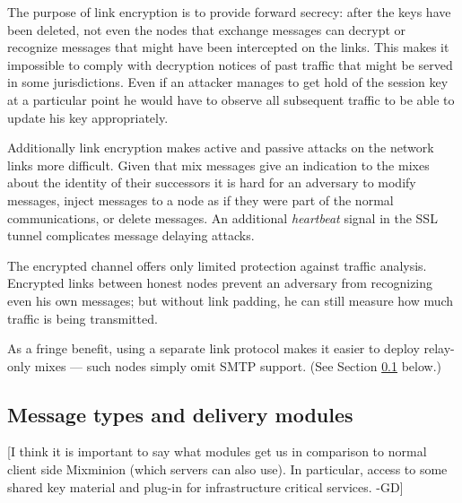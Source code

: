 \documentclass[11pt]{IEEEtran}
\begin{document}
The purpose of link encryption is to provide forward secrecy: 
after the keys have been deleted, not even the
nodes that exchange messages can decrypt or recognize messages
that might have been intercepted on the links. This makes it
impossible to comply with decryption notices of past traffic 
that might be served in
some jurisdictions.  
Even if an
attacker manages to get hold of the session key at a particular point
he would have to observe all subsequent traffic to be able to update
his key appropriately.

Additionally link encryption makes active and passive attacks on the
network links more difficult. Given that mix messages give an
indication to the mixes about the identity of their successors it is
hard for an 
adversary to modify messages, inject messages to a node as if they
were part of the normal communications, or delete messages.
An additional \emph{heartbeat} signal in the SSL tunnel complicates
message delaying attacks.

The encrypted channel offers only limited protection against traffic
analysis. Encrypted links between honest nodes prevent an adversary
from recognizing even his own messages; but without link padding, he
can still measure how much traffic is being transmitted.

As a fringe benefit, using a separate link protocol makes it
easier to deploy relay-only mixes --- such nodes simply omit SMTP
support.  (See Section \ref{subsec:delivery-modules} below.)

\subsection{Message types and delivery modules}
\label{subsec:delivery-modules}

[I think it is important to say what modules get us in comparison to
normal client side Mixminion (which servers can also use). In
particular, access to some shared key material and plug-in for
infrastructure critical services. -GD]
\end{document}
